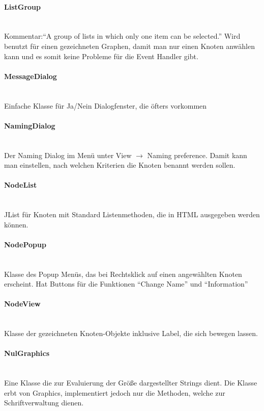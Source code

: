 \documentclass[10pt,a4paper]{article}
\begin{document}
\paragraph{ListGroup}\ \\Kommentar:"`A group of lists in which only one item can be selected."' Wird benutzt für einen gezeichneten Graphen, damit man nur einen Knoten anwählen kann und es somit keine Probleme für die Event Handler gibt.

\paragraph{MessageDialog}\ \\Einfache Klasse für Ja/Nein Dialogfenster, die öfters vorkommen

\paragraph{NamingDialog}\ \\Der Naming Dialog im Menü unter View $\rightarrow$ Naming preference. Damit kann man einstellen, nach welchen Kriterien die Knoten benannt werden sollen.

\paragraph{NodeList}\ \\JList für Knoten mit Standard Listenmethoden, die in HTML ausgegeben werden können.

\paragraph{NodePopup}\ \\Klasse des Popup Menüs, das bei Rechtsklick auf einen angewählten Knoten erscheint. Hat Buttons für die Funktionen "`Change Name"' und "`Information"'

\paragraph{NodeView}\ \\Klasse der gezeichneten Knoten-Objekte inklusive Label, die sich bewegen lassen.

\paragraph{NulGraphics}\ \\Eine Klasse die zur Evaluierung der Größe dargestellter Strings dient. Die Klasse erbt von Graphics, implementiert jedoch nur die Methoden, welche zur Schriftverwaltung dienen.
\end{document}
